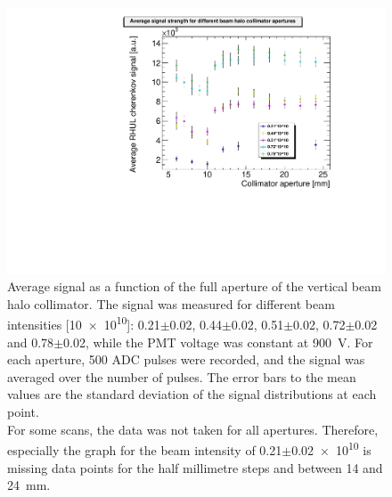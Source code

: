 \begin{figure}
\centering
\includegraphics[width=\textwidth]{Figures/AverageSignal_perAperture.pdf}
\caption[RHUL Cherenkov detector signal vs. collimator aperture: different beam intensities]{Average signal as a function of the full aperture of the vertical beam halo collimator. The signal was measured for different beam intensities [\num{10e10}]: 0.21$\pm$0.02, 0.44$\pm$0.02, 0.51$\pm$0.02, 0.72$\pm$0.02 and 0.78$\pm$0.02, while the PMT voltage was constant at \SI{900}{\volt}. For each aperture, 500 ADC pulses were recorded, and the signal was averaged over the number of pulses. The error bars to the mean values are the standard deviation of the signal distributions at each point.\\For some scans, the data was not taken for all apertures. Therefore, especially the graph for the beam intensity of \num{0.21}$\pm$\num{0.02e10} is missing data points for the half millimetre steps and between 14 and \SI{24}{\milli\metre}.}
\label{fig:AverageSignal_Aperture_BeamIntensities}
\end{figure}
